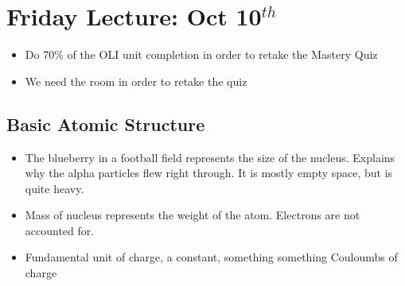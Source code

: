 \documentclass{article}
\begin{document}
\section{Friday Lecture: Oct 10$^{th}$}
\begin{itemize}
  \item Do 70\% of the OLI unit completion in order to retake the Mastery Quiz
  \item We need the room in order to retake the quiz
\end{itemize}
\subsection{Basic Atomic Structure}
\begin{itemize}
  \item The blueberry in a football field represents the size of the nucleus.
    Explains why the alpha particles flew right through. It is mostly
    empty space, but is quite heavy.
  \item Mass of nucleus represents the weight of the atom. Electrons are not accounted for.
  \item Fundamental unit of charge, a constant, something something Couloumbs of charge
\end{itemize}
\end{document}
